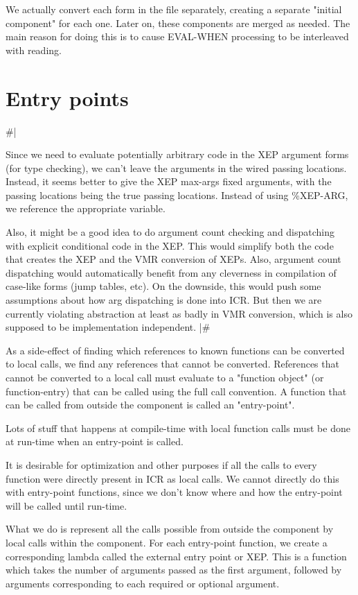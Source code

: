 We actually convert each form in the file separately, creating a separate
"initial component" for each one.  Later on, these components are merged as
needed.  The main reason for doing this is to cause EVAL-WHEN processing to be
interleaved with reading. 


\section{Entry points}

\#|

Since we need to evaluate potentially arbitrary code in the XEP argument forms
(for type checking), we can't leave the arguments in the wired passing
locations.  Instead, it seems better to give the XEP max-args fixed arguments,
with the passing locations being the true passing locations.  Instead of using
\%XEP-ARG, we reference the appropriate variable.

Also, it might be a good idea to do argument count checking and dispatching
with explicit conditional code in the XEP.  This would simplify both the code
that creates the XEP and the VMR conversion of XEPs.  Also, argument count
dispatching would automatically benefit from any cleverness in compilation of
case-like forms (jump tables, etc).  On the downside, this would push some
assumptions about how arg dispatching is done into ICR.  But then we are
currently violating abstraction at least as badly in VMR conversion, which is
also supposed to be implementation independent.
|\#

As a side-effect of finding which references to known functions can be
converted to local calls, we find any references that cannot be converted.
References that cannot be converted to a local call must evaluate to a
"function object" (or function-entry) that can be called using the full call
convention.  A function that can be called from outside the component is called
an "entry-point".

Lots of stuff that happens at compile-time with local function calls must be
done at run-time when an entry-point is called.

It is desirable for optimization and other purposes if all the calls to every
function were directly present in ICR as local calls.  We cannot directly do
this with entry-point functions, since we don't know where and how the
entry-point will be called until run-time.

What we do is represent all the calls possible from outside the component by
local calls within the component.  For each entry-point function, we create a
corresponding lambda called the external entry point or XEP.  This is a
function which takes the number of arguments passed as the first argument,
followed by arguments corresponding to each required or optional argument.


